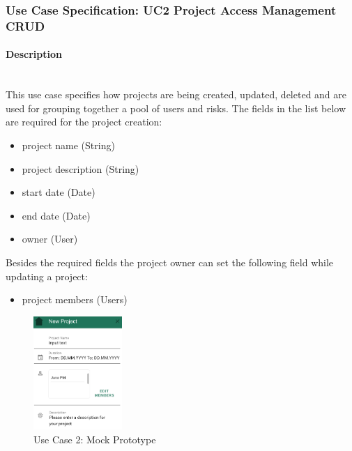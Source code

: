 
\newpage
\subsubsection{Use Case Specification: \ac{UC}2 Project Access Management CRUD}
\label{sec:domainBbc}

\paragraph*{Description}\mbox{}\\
This use case specifies how projects are being created, updated, deleted and are used for grouping together a pool of users and risks.
The fields in the list below are required for the project creation:

\begin{itemize}
	\vspace{-3mm}
	\setlength\itemsep{-1em}
	\item project name (String)
	\item project description (String)
	\item start date (Date)
	\item end date (Date)
	\item owner (User)
\end{itemize}
Besides the required fields the project owner can set the following field while updating a project:
\begin{itemize}
	\vspace{-3mm}
	\setlength\itemsep{-1em}
	\item project members (Users)
\end{itemize}

\begin{figure}
	\includegraphics[width=0.3\textwidth]{Assets/UC_Screenshots/UC2S.png}
	\caption{Use Case 2: Mock Prototype}
	\label{fig:useCase2Detail}
\end{figure}

